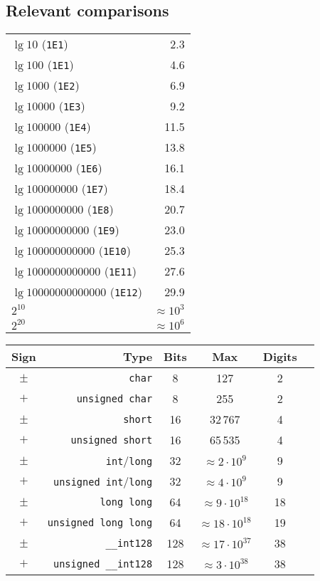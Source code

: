\documentclass[a4paper]{article}
\begin{document}
\subsection{Relevant comparisons}
\begin{table}[ht]
  \centering
  \begin{tabular}{l|r}
    \hline
    $\lg 10$ (\texttt{1E1}) & 2.3 \\
    $\lg 100$ (\texttt{1E1}) & 4.6 \\
    $\lg 1000$ (\texttt{1E2}) & 6.9 \\
    $\lg 10000$ (\texttt{1E3}) & 9.2 \\
    $\lg 100000$ (\texttt{1E4}) & 11.5 \\
    $\lg 1000000$ (\texttt{1E5}) & 13.8 \\
    $\lg 10000000$ (\texttt{1E6}) & 16.1 \\
    $\lg 100000000$ (\texttt{1E7}) & 18.4 \\
    $\lg 1000000000$ (\texttt{1E8}) & 20.7 \\
    $\lg 10000000000$ (\texttt{1E9}) & 23.0 \\
    $\lg 100000000000$ (\texttt{1E10}) & 25.3 \\
    $\lg 1000000000000$ (\texttt{1E11}) & 27.6 \\
    $\lg 10000000000000$ (\texttt{1E12}) & 29.9 \\
    $2^{10}$ & $\approx 10^{3}$ \\
    $2^{20}$ & $\approx 10^{6}$ \\
    \hline
  \end{tabular}
\end{table}

\begin{table}[ht]
  \centering
  \begin{tabular}{crcccc}
    \hline
    Sign & Type & Bits & Max & Digits \\
    \hline
    $\pm$ & \texttt{char} & 8 & 127 & 2 \\
     $+$  & \texttt{unsigned char} & 8 & 255 & 2 \\
    $\pm$ & \texttt{short} & 16 & 32\,767 & 4 \\
     $+$  & \texttt{unsigned short} & 16 & 65\,535 & 4 \\
    $\pm$ & \texttt{int}/\texttt{long} & 32 & $\approx 2 \cdot 10^{9}$ & 9\\
     $+$  & \texttt{unsigned int}/\texttt{long} & 32 & $\approx 4 \cdot 10^{9}$ & 9 \\
    $\pm$ & \texttt{long long} & 64 & $\approx 9 \cdot 10^{18}$ & 18 \\
     $+$  & \texttt{unsigned long long} & 64 & $\approx 18 \cdot 10^{18}$ & 19 \\
    $\pm$ & \texttt{\_\_int128} & 128 & $\approx 17 \cdot 10^{37}$ & 38 \\
     $+$  & \texttt{unsigned \_\_int128} & 128 & $\approx 3 \cdot 10^{38}$ & 38 \\
    \hline
  \end{tabular}
\end{table}
\end{document}
